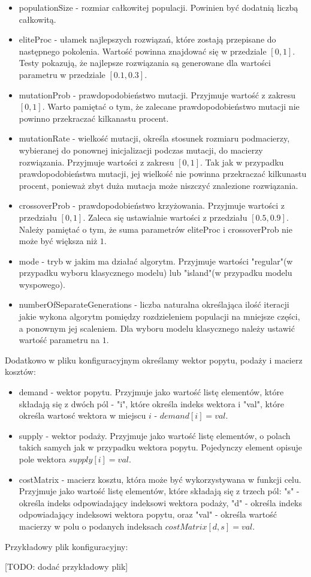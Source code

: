 \begin{itemize}
    \item populationSize - rozmiar całkowitej populacji. Powinien być dodatnią liczbą całkowitą.
    \item eliteProc - ułamek najlepszych rozwiązań, które zostają przepisane do następnego pokolenia. 
    Wartość powinna znajdować się w przedziale $[0, 1]$. Testy pokazują, że najlepsze rozwiązania są generowane dla wartości parametru w przedziale
    $[0.1, 0.3]$.
    \item mutationProb - prawdopodobieństwo mutacji. Przyjmuje wartość z zakresu $[0, 1]$. Warto pamiętać o tym, że zalecane prawdopodobieństwo 
    mutacji nie powinno przekraczać kilkanastu procent.
    \item mutationRate - wielkość mutacji, określa stosunek rozmiaru podmacierzy, wybieranej do ponownej inicjalizacji podczas mutacji, 
    do macierzy rozwiązania. Przyjmuje wartości z zakresu $[0, 1]$. Tak jak w przypadku prawdopodobieństwa mutacji, jej wielkość nie powinna 
    przekraczać kilkunastu procent, ponieważ zbyt duża mutacja może niszczyć znalezione rozwiązania.
    \item crossoverProb - prawdopodobieństwo krzyżowania. Przyjmuje wartości z przedziału $[0, 1]$. Zaleca się ustawialnie wartości z przedziału 
    $[0.5, 0.9]$. Należy pamiętać o tym, że suma parametrów eliteProc i crossoverProb nie może być większa niż $1$.
    \item mode - tryb w jakim ma działać algorytm. Przyjmuje wartości "regular"(w przypadku wyboru klasycznego modelu) lub "island"(w przypadku 
    modelu wyspowego).
    \item numberOfSeparateGenerations - liczba naturalna określająca ilość iteracji jakie wykona algorytm pomiędzy rozdzieleniem populacji na 
    mniejsze części, a ponownym jej scaleniem. Dla wyboru modelu klasycznego należy ustawić wartość parametru na $1$.
\end{itemize}

Dodatkowo w pliku konfiguracyjnym określamy wektor popytu, podaży i macierz kosztów:

\begin{itemize}
    \item demand - wektor popytu. Przyjmuje jako wartość listę elementów, które składają się z dwóch pól - "i", które określa indeks wektora i 
    "val", które określa wartosć wektora w miejscu $i$ - $demand[i] = val$.
    \item supply - wektor podaży. Przyjmuje jako wartość listę elementów, o polach takich samych jak w przypadku wektora popytu. Pojedynczy element 
    opisuje pole wektora $supply[i] = val$.
    \item costMatrix - macierz kosztu, która może być wykorzystywana w funkcji celu. Przyjmuje jako wartość listę elementów, które składają się 
    z trzech pól: "s" - określa indeks odpowiadający indeksowi wektora podaży, "d" - określa indeks odpowiadający indeksowi wektora popytu, oraz 
    "val" - określa wartość macierzy w polu o podanych indeksach $costMatrix[d, s] = val$.
\end{itemize}

Przykładowy plik konfiguracyjny:

[TODO: dodać przykładowy plik]
